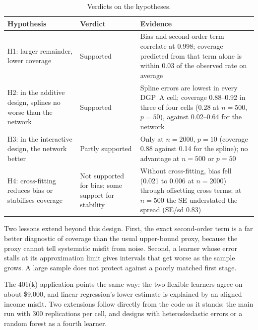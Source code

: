 \documentclass[11pt,a4paper]{article}
\begin{document}
\begin{table}[h]
\centering\small
\caption*{Verdicts on the hypotheses.}
\begin{tabularx}{\textwidth}{>{\raggedright\arraybackslash}p{4.1cm}>{\raggedright\arraybackslash}p{2.6cm}>{\raggedright\arraybackslash}X}
\toprule
Hypothesis & Verdict & Evidence\\
\midrule
H1: larger remainder, lower coverage & Supported & Bias and second-order term correlate at 0.998; coverage predicted from that term alone is within 0.03 of the observed rate on average\\
H2: in the additive design, splines no worse than the network & Supported & Spline errors are lowest in every DGP~A cell; coverage 0.88--0.92 in three of four cells (0.28 at $n=500$, $p=50$), against 0.02--0.64 for the network\\
H3: in the interactive design, the network better & Partly supported & Only at $n=2000$, $p=10$ (coverage 0.88 against 0.14 for the spline); no advantage at $n=500$ or $p=50$\\
H4: cross-fitting reduces bias or stabilises coverage & Not supported for bias; some support for stability & Without cross-fitting, bias fell (0.021 to 0.006 at $n=2000$) through offsetting cross terms; at $n=500$ the SE understated the spread (SE/sd 0.83)\\
\bottomrule
\end{tabularx}
\end{table}

Two lessons extend beyond this design. First, the exact second-order term is a far better diagnostic of coverage than the usual upper-bound proxy, because the proxy cannot tell systematic misfit from noise. Second, a learner whose error stalls at its approximation limit gives intervals that get worse as the sample grows. A large sample does not protect against a poorly matched first stage.

The 401(k) application points the same way: the two flexible learners agree on about \$9,000, and linear regression's lower estimate is explained by an aligned income misfit. Two extensions follow directly from the code as it stands: the main run with 300 replications per cell, and designs with heteroskedastic errors or a random forest as a fourth learner.
\end{document}
